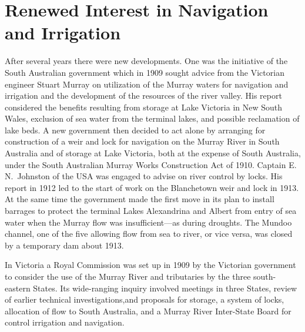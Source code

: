 \section*{Renewed Interest in Navigation and Irrigation}

After several years there were new developments. One was the
initiative of the South Australian government which in 1909 sought
advice from the Victorian engineer Stuart Murray on utilization of the
Murray waters for navigation and irrigation and the development of the
resources of the river valley.  His report considered the benefits
resulting from storage at Lake Victoria in New South Wales, exclusion
of sea water from the terminal lakes, and possible reclamation of lake
beds.  A new government then decided to act
alone by arranging for construction of a weir and lock for navigation
on the Murray River in South Australia and of storage at Lake
Victoria, both at the expense of South Australia, under the South
Australian Murray Works Construction Act of 1910.  Captain
E.\,N.~Johnston of the USA was engaged to advise on river control by
locks.  His report in 1912 led to the start of work on the Blanchetown
weir and lock in 1913.  At the same time the government
made the first move in its plan to install barrages to protect the
terminal Lakes Alexandrina and Albert from entry of sea water when the
Murray flow was insufficient---as during droughts.  The Mundoo
channel, one of the five allowing flow from sea to river, or vice
versa, was closed by a temporary dam about 1913.

In Victoria a Royal Commission was set up in 1909 by the Victorian
government to consider the use of the Murray River and tributaries by
the three south-eastern States.  Its wide-ranging inquiry involved
meetings in three States, review of earlier technical
investigations,and proposals for storage, a system of locks,
allocation of flow to South Australia, and a Murray River Inter-State
Board for control irrigation and navigation.

